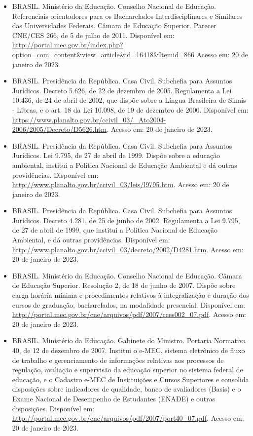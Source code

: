 \begin{itemize}
    \item BRASIL. Ministério da Educação. Conselho Nacional de Educação.
    Referenciais orientadores para os Bacharelados Interdisciplinares e
    Similares das Universidades Federais. Câmara de Educação Superior. Parecer
    CNE/CES 266, de 5 de julho de 2011.
    Disponível em:
    \url{http://portal.mec.gov.br/index.php?option=com_content&view=article&id=16418&Itemid=866}
    Acesso em: 20 de janeiro de 2023.
    
    \item BRASIL. Presidência da República. Casa Civil. Subchefia para Assuntos
    Jurídicos. Decreto 5.626, de 22 de dezembro de 2005. Regulamenta a Lei
    10.436, de 24 de abril de 2002, que dispõe sobre a Língua Brasileira de
    Sinais - Libras, e o art. 18 da Lei 10.098, de 19 de dezembro de 2000.
    Disponível em: \url{https://www.planalto.gov.br/ccivil_03/_Ato2004-2006/2005/Decreto/D5626.htm}.
    Acesso em: 20 de janeiro de 2023.
    
    \item  BRASIL. Presidência da República. Casa Civil. Subchefia para
    Assuntos Jurídicos. Lei 9.795, de 27 de abril de 1999. Dispõe sobre a
    educação ambiental, institui a Política Nacional de Educação Ambiental e dá
    outras providências. 
    Disponível em: \url{http://www.planalto.gov.br/ccivil_03/leis/l9795.htm}.
    Acesso em: 20 de janeiro de 2023.
    
    \item BRASIL. Presidência da República. Casa Civil. Subchefia para Assuntos
    Jurídicos. Decreto 4.281, de 25 de junho de 2002. Regulamenta a Lei 9.795,
    de 27 de abril de 1999, que institui a Política Nacional de Educação
    Ambiental, e dá outras providências. 
    Disponível em: \url{http://www.planalto.gov.br/ccivil_03/decreto/2002/D4281.htm}.
    Acesso em: 20 de janeiro de 2023.
    
    \item BRASIL. Ministério da Educação. Conselho Nacional de Educação. Câmara
    de Educação Superior. Resolução 2, de 18 de junho de 2007. Dispõe sobre
    carga horária mínima e procedimentos relativos à integralização e duração
    dos cursos de graduação, bacharelados, na modalidade presencial. 
    Disponível em: \url{http://portal.mec.gov.br/cne/arquivos/pdf/2007/rces002_07.pdf}.
    Acesso em: 20 de janeiro de 2023.
    
    \item BRASIL. Ministério da Educação. Gabinete do Ministro. Portaria
    Normativa 40, de 12 de dezembro de 2007. Institui o e-MEC, sistema
    eletrônico de fluxo de trabalho e gerenciamento de informações relativas
    aos processos de regulação, avaliação e supervisão da educação superior no
    sistema federal de educação, e o Cadastro e-MEC de Instituições e Cursos
    Superiores e consolida disposições sobre indicadores de qualidade, banco de
    avaliadores (Basis) e o Exame Nacional de Desempenho de Estudantes (ENADE)
    e outras disposições.
    Disponível em: \url{http://portal.mec.gov.br/cne/arquivos/pdf/2007/port40_07.pdf}.
    Acesso em: 20 de janeiro de 2023.
    

\end{itemize}

